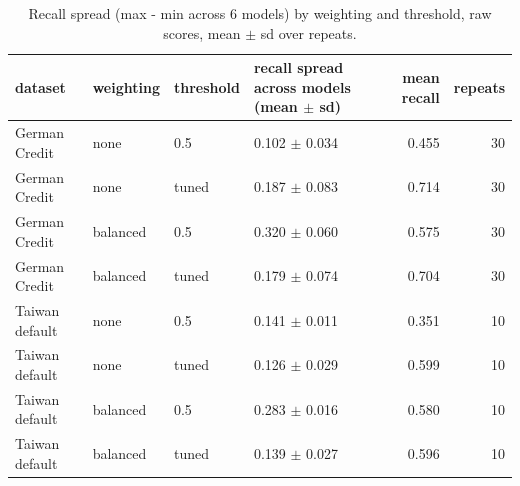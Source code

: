 \begin{table}[t]
\centering
\caption{Recall spread (max - min across 6 models) by weighting and threshold, raw scores, mean $\pm$ sd over repeats.}
\label{tab:T16f_external_recall_spread}
\small
\begin{tabular}{llllrr}
\toprule
dataset & weighting & threshold & recall spread across models (mean $\pm$ sd) & mean recall & repeats \\
\midrule
German Credit & none & 0.5 & 0.102 $\pm$ 0.034 & 0.455 & 30 \\
German Credit & none & tuned & 0.187 $\pm$ 0.083 & 0.714 & 30 \\
German Credit & balanced & 0.5 & 0.320 $\pm$ 0.060 & 0.575 & 30 \\
German Credit & balanced & tuned & 0.179 $\pm$ 0.074 & 0.704 & 30 \\
Taiwan default & none & 0.5 & 0.141 $\pm$ 0.011 & 0.351 & 10 \\
Taiwan default & none & tuned & 0.126 $\pm$ 0.029 & 0.599 & 10 \\
Taiwan default & balanced & 0.5 & 0.283 $\pm$ 0.016 & 0.580 & 10 \\
Taiwan default & balanced & tuned & 0.139 $\pm$ 0.027 & 0.596 & 10 \\
\bottomrule
\end{tabular}
\end{table}
